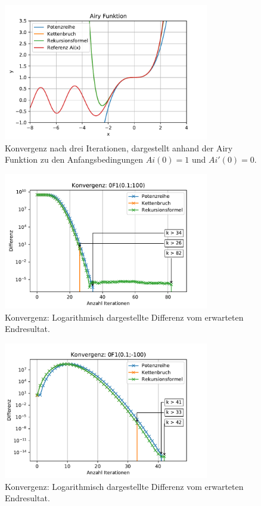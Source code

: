 \begin{figure}
    \centering
    \includegraphics[width=0.8\textwidth]{papers/0f1/images/konvergenzAiry.pdf}
    \caption{Konvergenz nach drei Iterationen, dargestellt anhand der Airy Funktion zu den Anfangsbedingungen $Ai(0)=1$ und $Ai'(0)=0$.
    \label{0f1:ausblick:plot:airy:konvergenz}}
\end{figure}

\begin{figure}
    \centering
    \includegraphics[width=0.8\textwidth]{papers/0f1/images/konvergenzPositiv.pdf}
    \caption{Konvergenz: Logarithmisch dargestellte Differenz vom erwarteten Endresultat.
    \label{0f1:ausblick:plot:konvergenz:positiv}}
\end{figure}

\begin{figure}
    \centering
    \includegraphics[width=0.8\textwidth]{papers/0f1/images/konvergenzNegativ.pdf}
    \caption{Konvergenz: Logarithmisch dargestellte Differenz vom erwarteten Endresultat.
    \label{0f1:ausblick:plot:konvergenz:negativ}}
\end{figure}

